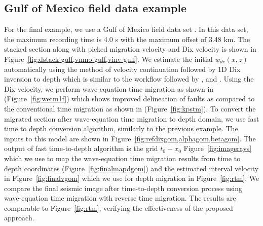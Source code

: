 \documentclass[manuscript]{geophysics}
\begin{document}
\subsection{Gulf of Mexico field data example}
For the final example, we use a Gulf of Mexico field data set \cite[]{claerbout1995basic}. In this data set, the maximum recording time is 4.0 s with the maximum offset of 3.48 km. The stacked section along with picked migration velocity and Dix velocity is shown in Figure~\ref{fig:dstack-gulf,vnmo-gulf,vinv-gulf}. We estimate the initial $w_{dr}(x,z)$ automatically using the method of velocity continuation \cite[]{fomel2003time} followed by 1D Dix inversion to depth which is similar to the workflow  followed by \cite{siwei2}, and \cite{sripanich2018fast}. Using the Dix velocity, we perform wave-equation time migration as shown in (Figure~\ref{fig:wetm1f}) which shows improved delineation of faults as compared to the conventional  time migration as shown in (Figure~\ref{fig:kpstm}). To convert the migrated section after wave-equation time migration to depth domain, we use fast time to depth conversion algorithm, similarly to the previous example. The inputs to this model are shown in Figure~\ref{fig:refdixgom,alphagom,betagom}. The output of fast time-to-depth algorithm is the grid $t_0-x_0$ Figure~\ref{fig:imagerays}  which we use to map the wave-equation time migration results from time to depth coordinates (Figure~\ref{fig:finalmapdgom}) and the estimated interval velocity in Figure~\ref{fig:finalvgom} which we use for depth migration in Figure~\ref{fig:rtm}. We compare the final seismic image after time-to-depth conversion process using wave-equation time migration with reverse time migration. The results are comparable to Figure~\ref{fig:rtm}, verifying the effectiveness of the proposed approach.
\end{document}
